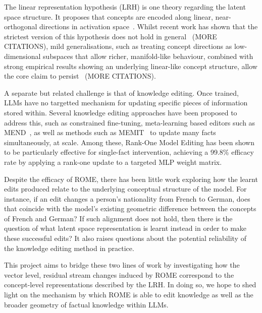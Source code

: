 \documentclass[11pt,a4paper]{article}
\newcommand{\vv}{\mathbf{v}}
\newcommand{\uu}{\mathbf{u}}
\newcommand{\WW}{\mathbf{W}}
\begin{document}
The linear representation hypothesis (LRH) is one theory regarding the latent space structure. It proposes that concepts are encoded along linear, near-orthogonal directions in activation space~\citep{mikolov2013linguistic,lrhorig}. Whilst recent work has shown that the strictest version of this hypothesis does not hold in general~\citep{engels2024not} (MORE CITATIONS), mild generalisations, such as treating concept directions as low-dimensional subspaces that allow richer, manifold-like behaviour, combined with strong empirical results showing an underlying linear-like concept structure, allow the core claim to persist~\citep{lrhorig} (MORE CITATIONS).

A separate but related challenge is that of knowledge editing. Once trained, LLMs have no targetted mechanism for updating specific pieces of information stored within. Several knowledge editing approaches have been proposed to address this, such as constrained fine-tuning, meta-learning based editors such as MEND~\citep{mitchell2022fast}, as well as methods such as MEMIT~\citep{meng2022mass} to update many facts simultaneously, at scale.
Among these, Rank-One Model Editing \citep[ROME;][]{meng2022locating} has been shown to be particularly effective for single-fact intervention, achieving a 99.8\% efficacy rate by applying a rank-one update to a targeted MLP weight matrix.

Despite the efficacy of ROME, there has been little work exploring how the learnt edits produced relate to the underlying conceptual structure of the model. For instance, if an edit changes a person's nationality from French to German, does that coincide with the model's existing geometric difference between the concepts of French and German? If such alignment does not hold, then there is the question of what latent space representation is learnt instead in order to make these successful edits? It also raises questions about the potential reliability of the knowledge editing method in practice.

This project aims to bridge these two lines of work by investigating how the vector level, residual stream changes induced by ROME correspond to the concept-level representations described by the LRH. In doing so, we hope to shed light on the mechanism by which ROME is able to edit knowledge as well as the broader geometry of factual knowledge within LLMs.


\end{document}
